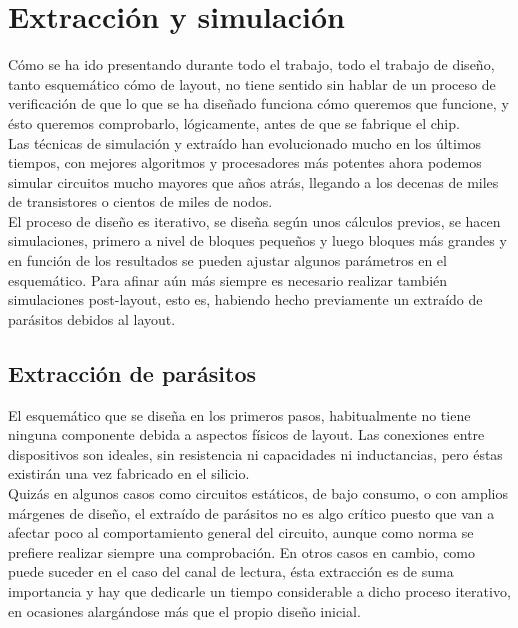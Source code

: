 \chapter{Extracción y simulación}

Cómo se ha ido presentando durante todo el trabajo, todo el trabajo de diseño,
tanto esquemático cómo de layout, no tiene sentido sin hablar de un proceso de
verificación de que lo que se ha diseñado funciona cómo queremos que funcione,
y ésto queremos comprobarlo, lógicamente, antes de que se fabrique el chip.\\

Las técnicas de simulación y extraído han evolucionado mucho en los últimos tiempos,
con mejores algoritmos y procesadores más potentes ahora podemos simular circuitos
mucho mayores que años atrás, llegando a los decenas de miles de transistores o
cientos de miles de nodos.\\

El proceso de diseño es iterativo, se diseña según unos cálculos previos, se hacen
simulaciones, primero a nivel de bloques pequeños y luego bloques más grandes y
en función de los resultados se pueden ajustar algunos parámetros en el esquemático.
Para afinar aún más siempre es necesario realizar también simulaciones post-layout,
esto es, habiendo hecho previamente un extraído de parásitos debidos al layout.\\

\section{Extracción de parásitos}\label{cap:extraccion}

El esquemático que se diseña en los primeros pasos, habitualmente no tiene ninguna
componente debida a aspectos físicos de layout. Las conexiones entre dispositivos
son ideales, sin resistencia ni capacidades ni inductancias, pero éstas existirán
una vez fabricado en el silicio.\\

Quizás en algunos casos como circuitos estáticos, de bajo consumo, o con amplios
márgenes de diseño, el extraído de parásitos no es algo crítico puesto que van a
afectar poco al comportamiento general del circuito, aunque como norma se prefiere
realizar siempre una comprobación. En otros casos en cambio, como puede suceder
en el caso del canal de lectura, ésta extracción es de suma importancia y hay
que dedicarle un tiempo considerable a dicho proceso iterativo, en ocasiones
alargándose más que el propio diseño inicial.\\

